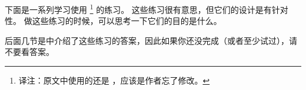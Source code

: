下面是一系列学习使用  \footnote{译注：原文中使用的还是  ，应该是作者忘了修改。} 的练习。  
这些练习很有意思，但它们的设计是有针对性。
做这些练习的时候，可以思考一下它们的目的是什么。


后面几节是中介绍了这些练习的答案，因此如果你还没完成（或者至少试过），请不要看答案。


